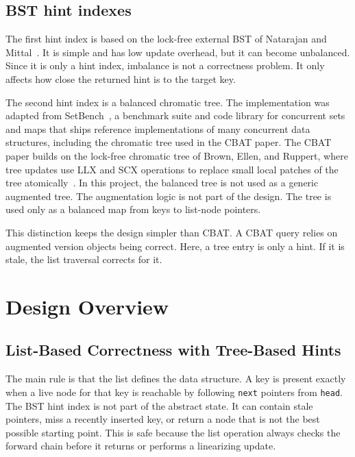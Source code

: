\documentclass[a4paper,11pt]{article}
\newcommand{\code}[1]{\texttt{#1}}
\begin{document}
\subsection{BST hint indexes}

The first hint index is based on the lock-free external BST of Natarajan and Mittal~\cite{natarajan2014fast}. It is simple and has low update overhead, but it can become unbalanced. Since it is only a hint index, imbalance is not a correctness problem. It only affects how close the returned hint is to the target key.

The second hint index is a balanced chromatic tree. The implementation was adapted from SetBench~\cite{brown2020setbench}, a benchmark suite and code library for concurrent sets and maps that ships reference implementations of many concurrent data structures, including the chromatic tree used in the CBAT paper. The CBAT paper builds on the lock-free chromatic tree of Brown, Ellen, and Ruppert, where tree updates use LLX and SCX operations to replace small local patches of the tree atomically~\cite{brown2014general,wrench2026cbat}. In this project, the balanced tree is not used as a generic augmented tree. The augmentation logic is not part of the design. The tree is used only as a balanced map from keys to list-node pointers.

This distinction keeps the design simpler than CBAT. A CBAT query relies on augmented version objects being correct. Here, a tree entry is only a hint. If it is stale, the list traversal corrects for it.

\section{Design Overview}

\subsection{List-Based Correctness with Tree-Based Hints}

The main rule is that the list defines the data structure. A key is present exactly when a live node for that key is reachable by following \code{next} pointers from \code{head}. The BST hint index is not part of the abstract state. It can contain stale pointers, miss a recently inserted key, or return a node that is not the best possible starting point. This is safe because the list operation always checks the forward chain before it returns or performs a linearizing update.
\end{document}
